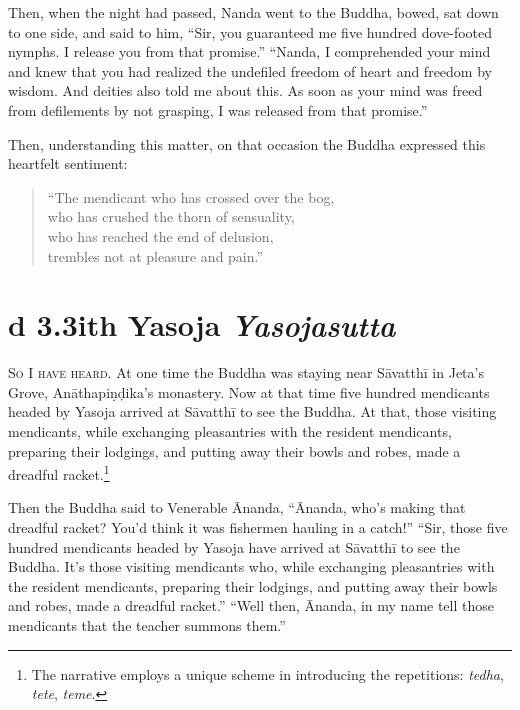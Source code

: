 \documentclass[12pt,openany]{book}%
\newcommand*{\suttatitleacronym}[1]{\smaller[2]{#1}\vspace*{.3em}}
\newcommand*{\suttatitletranslation}[1]{\linebreak{#1}}
\newcommand*{\suttatitleroot}[1]{\linebreak\smaller[2]\itshape{#1}}
\newcommand*{\tocacronym}[1]{\hspace*{-3.3em}{#1}\quad}
\newcommand*{\toctranslation}[1]{#1}
\newcommand*{\tocroot}[1]{(\textit{#1})}
\newcommand*{\scevam}[1]{\textsc{#1}}
\begin{document}
Then, when the night had passed, Nanda went to the Buddha, bowed, sat down to one side, and said to him, “Sir, you guaranteed me five hundred dove-footed nymphs. I release you from that promise.” “Nanda, I comprehended your mind and knew that you had realized the undefiled freedom of heart and freedom by wisdom. And deities also told me about this. As soon as your mind was freed from defilements by not grasping, I was released from that promise.” 

Then, understanding this matter, on that occasion the Buddha expressed this heartfelt sentiment: 

\begin{verse}%
“The mendicant who has crossed over the bog, \\
who has crushed the thorn of sensuality, \\
who has reached the end of delusion, \\
trembles not at pleasure and pain.” 

%
\end{verse}

%
\section*{{\suttatitleacronym Ud 3.3}{\suttatitletranslation With Yasoja }{\suttatitleroot Yasojasutta}}
\addcontentsline{toc}{section}{\tocacronym{Ud 3.3} \toctranslation{With Yasoja } \tocroot{Yasojasutta}}

\scevam{So I have heard. }At one time the Buddha was staying near \textsanskrit{Sāvatthī} in Jeta’s Grove, \textsanskrit{Anāthapiṇḍika}’s monastery. Now at that time five hundred mendicants headed by Yasoja arrived at \textsanskrit{Sāvatthī} to see the Buddha. At that, those visiting mendicants, while exchanging pleasantries with the resident mendicants, preparing their lodgings, and putting away their bowls and robes, made a dreadful racket.\footnote{The narrative employs a unique scheme in introducing the repetitions: \textit{tedha}, \textit{tete}, \textit{teme}. } 

Then the Buddha said to Venerable Ānanda, “Ānanda, who’s making that dreadful racket? You’d think it was fishermen hauling in a catch!” “Sir, those five hundred mendicants headed by Yasoja have arrived at \textsanskrit{Sāvatthī} to see the Buddha. It’s those visiting mendicants who, while exchanging pleasantries with the resident mendicants, preparing their lodgings, and putting away their bowls and robes, made a dreadful racket.” “Well then, Ānanda, in my name tell those mendicants that the teacher summons them.” 
\end{document}
